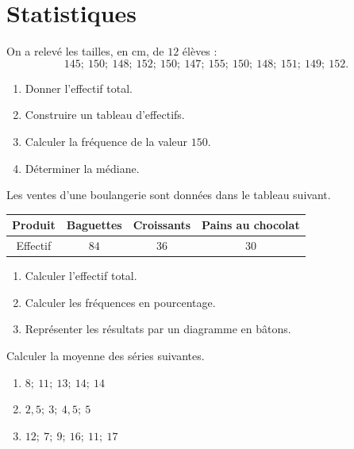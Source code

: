 \documentclass[a4paper,10pt]{report}
\begin{document}
\pagestyle{empty}
\section*{Statistiques}

\begin{ex}
On a relevé les tailles, en cm, de $12$ élèves :
\[
145;\ 150;\ 148;\ 152;\ 150;\ 147;\ 155;\ 150;\ 148;\ 151;\ 149;\ 152.
\]
\begin{enumerate}
\item Donner l'effectif total.
\item Construire un tableau d'effectifs.
\item Calculer la fréquence de la valeur $150$.
\item Déterminer la médiane.
\end{enumerate}
\end{ex}

\begin{ex}
Les ventes d'une boulangerie sont données dans le tableau suivant.
\begin{center}
\begin{tabular}{|c|c|c|c|}
\hline
Produit & Baguettes & Croissants & Pains au chocolat\\
\hline
Effectif & $84$ & $36$ & $30$\\
\hline
\end{tabular}
\end{center}
\begin{enumerate}
\item Calculer l'effectif total.
\item Calculer les fréquences en pourcentage.
\item Représenter les résultats par un diagramme en bâtons.
\end{enumerate}
\noindent\grandscarreaux{\linewidth}{5cm}
\end{ex}

\begin{ex}
Calculer la moyenne des séries suivantes.
\begin{enumerate}
\item $8;\ 11;\ 13;\ 14;\ 14$
\item $2,5;\ 3;\ 4,5;\ 5$
\item $12;\ 7;\ 9;\ 16;\ 11;\ 17$
\end{enumerate}
\end{ex}
\end{document}
